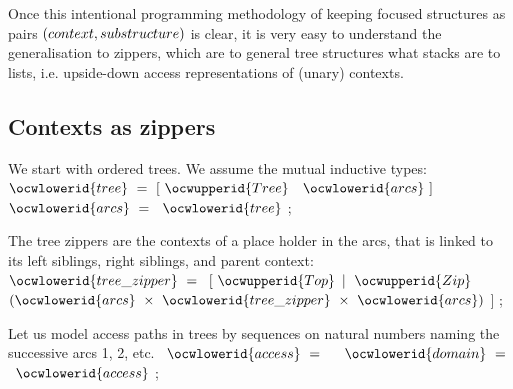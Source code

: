 \documentclass[12pt]{article}
\begin{document}
Once this intentional programming methodology of keeping focused structures
as pairs $(context,sub\-structure)$ is clear, it is very easy to understand the
generalisation to zippers, which are to general tree structures what stacks are
to lists, i.e. upside-down access representations of (unary) contexts.

\subsection{Contexts as zippers}

\label{../ML/zipper.ml:0}%
We start with ordered trees.
We assume the mutual inductive types: 
\ocweol
\label{../ML/zipper.ml:740}%
\medskip
\ocwbegincode{}\ocwindent{0.00em}
~$\ocwlowerid{tree}~=~[~\ocwupperid{Tree}~$~$\ocwlowerid{arcs}~]$\ocweol
\ocwindent{0.00em}
~$\ocwlowerid{arcs}~=~$~$\ocwlowerid{tree}$\ocweol
\ocwindent{0.00em}
;\medskip

\ocwendcode{}\ocwindent{0.00em}
The tree zippers are the contexts of a place holder in the arcs, that
is linked to its left siblings, right siblings, and parent context: 
\ocweol
\label{../ML/zipper.ml:938}%
\medskip
\ocwbegincode{}\ocwindent{0.00em}
~$\ocwlowerid{tree\_zipper}~=~$\ocweol
\ocwindent{1.00em}
$[~\ocwupperid{Top}$\ocweol
\ocwindent{1.00em}
$\mid{}~\ocwupperid{Zip}~$~$(\ocwlowerid{arcs}~\times{}~\ocwlowerid{tree\_zipper}~\times{}~\ocwlowerid{arcs})$\ocweol
\ocwindent{1.00em}
$]$\ocweol
\ocwindent{0.00em}
;\medskip

\ocwendcode{}\ocwindent{0.00em}
Let us model access paths in trees by sequences on natural numbers naming
the successive arcs 1, 2, etc. 
\ocweol
\label{../ML/zipper.ml:1124}%
\medskip
\ocwbegincode{}\ocwindent{0.00em}
~$\ocwlowerid{access}~=~$~\ocweol
\ocwindent{0.00em}
~$\ocwlowerid{domain}~=~$~$\ocwlowerid{access}$\ocweol
\ocwindent{0.00em}
;\medskip
\end{document}
